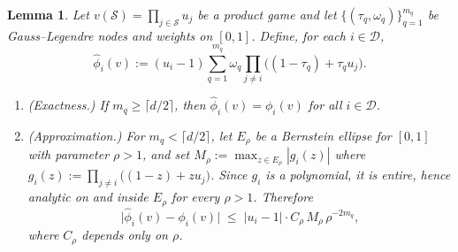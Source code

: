 \documentclass{article}
\newtheorem{lemma}{Lemma}
\newcommand{\cD}{\mathcal{D}}
\newcommand{\cS}{\mathcal{S}}
\begin{document}
\begin{lemma}
\label{lem:gl_shapley_integral}
Let $v(\cS)=\prod_{j\in\cS}u_j$ be a product game and let
$\{(\tau_q,\omega_q)\}_{q=1}^{m_q}$ be Gauss--Legendre nodes and weights on $[0,1]$.
Define, for each $i\in\cD$,
\begin{equation}
\label{eq:gl_quad_shapley}
\widehat{\phi}_i(v)
:=
(u_i-1)\sum_{q=1}^{m_q}\omega_q
\prod_{j\neq i}\bigl((1-\tau_q)+\tau_q u_j\bigr).
\end{equation}
\begin{enumerate}
  \item \emph{(Exactness.)} If $m_q\ge\lceil d/2\rceil$, then $\widehat{\phi}_i(v)=\phi_i(v)$ for all $i\in\cD$.
  \item \emph{(Approximation.)} For $m_q<\lceil d/2\rceil$, let $E_\rho$ be a
  Bernstein ellipse for $[0,1]$ with parameter $\rho>1$, and set
  $M_\rho:=\max_{z\in E_\rho}|g_i(z)|$ where
  $g_i(z):=\prod_{j\neq i}\bigl((1-z)+zu_j\bigr)$.
  Since $g_i$ is a polynomial, it is entire, hence analytic on and inside
  $E_\rho$ for every $\rho>1$.  Therefore
  \[
  \bigl|\widehat{\phi}_i(v)-\phi_i(v)\bigr|
  \;\le\;
  |u_i-1|\cdot C_\rho\,M_\rho\,\rho^{-2m_q},
  \]
  where $C_\rho$ depends only on $\rho$.
\end{enumerate}
\end{lemma}
\end{document}
